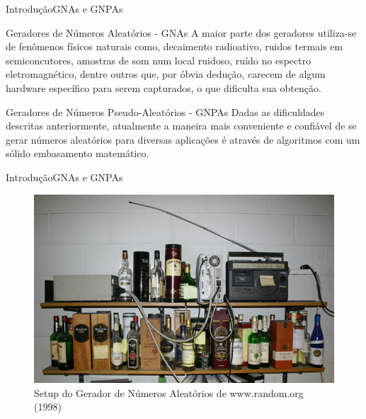 \documentclass[10pt,xcolor={dvipsnames}]{beamer}
\begin{document}
\begin{frame}{Introdução}{GNAs e GNPAs}
	\begin{block}{Geradores de Números Aleatórios - GNAs}
		A maior parte dos geradores utiliza-se de fenômenos físicos naturais como, decaimento radioativo, ruidos termais em semiconcutores, amostras de som num local ruidoso, ruído no espectro eletromagnético, dentre outros que, por óbvia dedução, carecem de algum hardware específico para serem capturados, o que dificulta sua obtenção. 
	\end{block}
\pause
	\begin{block}{Geradores de Números Pseudo-Aleatórios - GNPAs}
		Dadas as dificuldades descritas anteriormente, atualmente a maneira mais conveniente e confiável de se gerar números aleatórios para diversas aplicações é através de algoritmos com um sólido embasamento matemático.
	\end{block}	
\end{frame}

\begin{frame}{Introdução}{GNAs e GNPAs}
	\begin{figure}[hbt]
		\centering
		\includegraphics[width=\linewidth]{random_org}
		\caption{Setup do Gerador de Números Aleatórios de www.random.org (1998)}\label{fig:random_org}
	\end{figure}
\end{frame}
\end{document}
